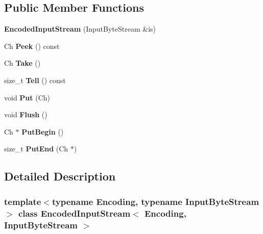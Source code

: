 \subsection*{Public Member Functions}
\begin{DoxyCompactItemize}
\item 
\mbox{\label{class_encoded_input_stream_a17f8e629500f6ae71cb72d1d63bf41fd}} 
{\bfseries Encoded\+Input\+Stream} (Input\+Byte\+Stream \&is)
\item 
\mbox{\label{class_encoded_input_stream_a046ab121d8dd303b9dc14d4b34940fad}} 
Ch {\bfseries Peek} () const
\item 
\mbox{\label{class_encoded_input_stream_ab42cd57581bf62e42af471583e5b8377}} 
Ch {\bfseries Take} ()
\item 
\mbox{\label{class_encoded_input_stream_afbe4ac0fc57fa992ba3aa5da8dc66527}} 
size\+\_\+t {\bfseries Tell} () const
\item 
\mbox{\label{class_encoded_input_stream_afea36b666a44bd4adeabfcab7b68a322}} 
void {\bfseries Put} (Ch)
\item 
\mbox{\label{class_encoded_input_stream_aa4415bf4b97dd01e8c3de0ad7a161724}} 
void {\bfseries Flush} ()
\item 
\mbox{\label{class_encoded_input_stream_ad97f7a549a8622c61b7fb2c63fedd69b}} 
Ch $\ast$ {\bfseries Put\+Begin} ()
\item 
\mbox{\label{class_encoded_input_stream_a83fe5ed281413d6005d1b324730e8bed}} 
size\+\_\+t {\bfseries Put\+End} (Ch $\ast$)
\end{DoxyCompactItemize}


\subsection{Detailed Description}
\subsubsection*{template$<$typename Encoding, typename Input\+Byte\+Stream$>$\newline
class Encoded\+Input\+Stream$<$ Encoding, Input\+Byte\+Stream $>$}

